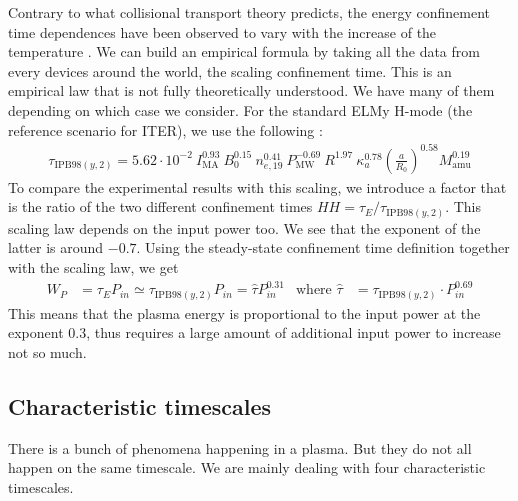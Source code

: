 Contrary to what collisional transport theory predicts, the energy confinement time dependences have been observed to vary with the increase of the temperature \cite{itoh}. We can build an empirical formula by taking all the data from every devices around the world, the scaling confinement time. This is an empirical law that is not fully theoretically understood. We have many of them depending on which case we consider. For the standard ELMy H-mode (the reference scenario for ITER), we use the following \cite{ipeg1999}:
\begin{align}\label{eq:confinement:transport:tau_scaling}
	\tau_{\mathrm{IPB}98(y,2)} = 5.62 \cdot 10^{-2}\ I_{\mathrm{MA}}^{0.93}\ B_0^{0.15}\ n_{e,19}^{0.41}\ P_{\mathrm{MW}}^{-0.69}\ R^{1.97}\ \kappa_a^{0.78} \left( \frac{a}{R_0} \right)^{0.58} M_{\mathrm{amu}}^{0.19}
\end{align}
To compare the experimental results with this scaling, we introduce a factor that is the ratio of the two different confinement times $H\!H = \tau_E / \tau_{\mathrm{IPB}98(y,2)}$. This scaling law depends on the input power too. We see that the exponent of the latter is around $-0.7$. Using the steady-state confinement time definition together with the scaling law, we get
\begin{align*}
	W_P & = \tau_E P_{in} \simeq \tau_{\mathrm{IPB}98(y,2)} P_{in} = \hat{\tau} P_{in}^{0.31} & \textrm{where } \hat{\tau} & = \tau_{\mathrm{IPB}98(y,2)} \cdot P_{in}^{0.69}
\end{align*}
This means that the plasma energy is proportional to the input power at the exponent 0.3, thus requires a large amount of additional input power to increase not so much.

\subsection{Characteristic timescales}\label{sec:confinement:transport:taus}
There is a bunch of phenomena happening in a plasma. But they do not all happen on the same timescale. We are mainly dealing with four characteristic timescales.

